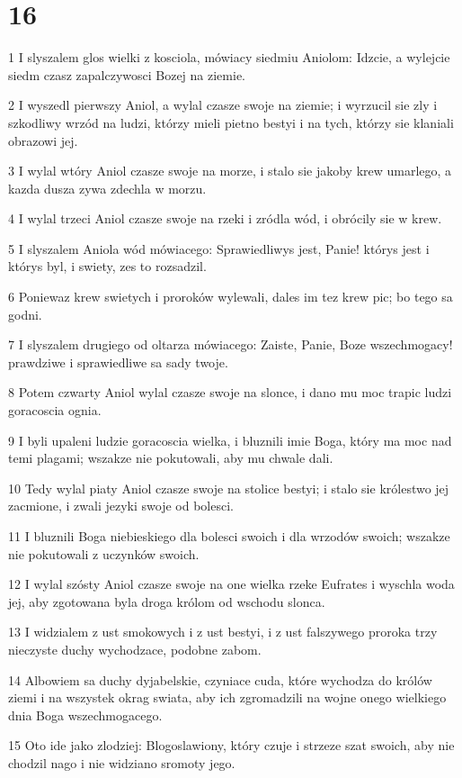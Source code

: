 \chapter{16}

\par 1 I slyszalem glos wielki z kosciola, mówiacy siedmiu Aniolom: Idzcie, a wylejcie siedm czasz zapalczywosci Bozej na ziemie.
\par 2 I wyszedl pierwszy Aniol, a wylal czasze swoje na ziemie; i wyrzucil sie zly i szkodliwy wrzód na ludzi, którzy mieli pietno bestyi i na tych, którzy sie klaniali obrazowi jej.
\par 3 I wylal wtóry Aniol czasze swoje na morze, i stalo sie jakoby krew umarlego, a kazda dusza zywa zdechla w morzu.
\par 4 I wylal trzeci Aniol czasze swoje na rzeki i zródla wód, i obrócily sie w krew.
\par 5 I slyszalem Aniola wód mówiacego: Sprawiedliwys jest, Panie! którys jest i którys byl, i swiety, zes to rozsadzil.
\par 6 Poniewaz krew swietych i proroków wylewali, dales im tez krew pic; bo tego sa godni.
\par 7 I slyszalem drugiego od oltarza mówiacego: Zaiste, Panie, Boze wszechmogacy! prawdziwe i sprawiedliwe sa sady twoje.
\par 8 Potem czwarty Aniol wylal czasze swoje na slonce, i dano mu moc trapic ludzi goracoscia ognia.
\par 9 I byli upaleni ludzie goracoscia wielka, i bluznili imie Boga, który ma moc nad temi plagami; wszakze nie pokutowali, aby mu chwale dali.
\par 10 Tedy wylal piaty Aniol czasze swoje na stolice bestyi; i stalo sie królestwo jej zacmione, i zwali jezyki swoje od bolesci.
\par 11 I bluznili Boga niebieskiego dla bolesci swoich i dla wrzodów swoich; wszakze nie pokutowali z uczynków swoich.
\par 12 I wylal szósty Aniol czasze swoje na one wielka rzeke Eufrates i wyschla woda jej, aby zgotowana byla droga królom od wschodu slonca.
\par 13 I widzialem z ust smokowych i z ust bestyi, i z ust falszywego proroka trzy nieczyste duchy wychodzace, podobne zabom.
\par 14 Albowiem sa duchy dyjabelskie, czyniace cuda, które wychodza do królów ziemi i na wszystek okrag swiata, aby ich zgromadzili na wojne onego wielkiego dnia Boga wszechmogacego.
\par 15 Oto ide jako zlodziej: Blogoslawiony, który czuje i strzeze szat swoich, aby nie chodzil nago i nie widziano sromoty jego.
